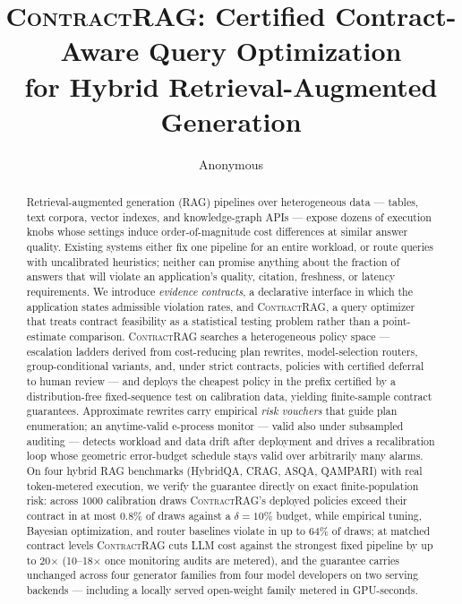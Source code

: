 \documentclass[sigconf,nonacm]{acmart}
\newcommand{\system}{\textsc{ContractRAG}\xspace}
\begin{document}
\title{\system: Certified Contract-Aware Query Optimization\\for Hybrid Retrieval-Augmented Generation}

\author{Anonymous}

\begin{abstract}
Retrieval-augmented generation (RAG) pipelines over heterogeneous data ---
tables, text corpora, vector indexes, and knowledge-graph APIs --- expose
dozens of execution knobs whose settings induce order-of-magnitude cost
differences at similar answer quality. Existing systems either fix one
pipeline for an entire workload, or route queries with uncalibrated
heuristics; neither can promise anything about the fraction of answers that
will violate an application's quality, citation, freshness, or latency
requirements. We introduce \emph{evidence contracts}, a declarative interface
in which the application states admissible violation rates, and \system, a
query optimizer that treats contract feasibility as a statistical testing
problem rather than a point-estimate comparison. \system searches a
heterogeneous policy space --- escalation ladders derived from cost-reducing
plan rewrites, model-selection routers, group-conditional variants, and,
under strict contracts, policies with certified deferral to human review
--- and deploys the cheapest policy in the prefix certified by a
distribution-free fixed-sequence test on calibration data, yielding
finite-sample contract guarantees. Approximate rewrites carry empirical
\emph{risk vouchers} that
guide plan enumeration; an anytime-valid e-process monitor --- valid also
under subsampled auditing --- detects workload
and data drift after deployment and drives a recalibration loop whose
geometric error-budget schedule stays valid over arbitrarily many
alarms. On four hybrid
RAG benchmarks (HybridQA, CRAG, ASQA, QAMPARI) with real token-metered
execution, we verify the guarantee directly on exact finite-population
risk: across 1000 calibration draws \system's deployed policies exceed
their contract in at most 0.8\% of draws against a $\delta=10\%$ budget,
while empirical tuning, Bayesian
optimization, and router baselines violate in up to 64\% of draws; at
matched contract levels \system cuts LLM cost against the strongest fixed
pipeline by up to 20$\times$ (10--18$\times$ once monitoring audits are
metered), and the guarantee carries unchanged across four generator
families from four model developers on two serving backends ---
including a locally served open-weight family metered in GPU-seconds.
\end{abstract}
\end{document}
